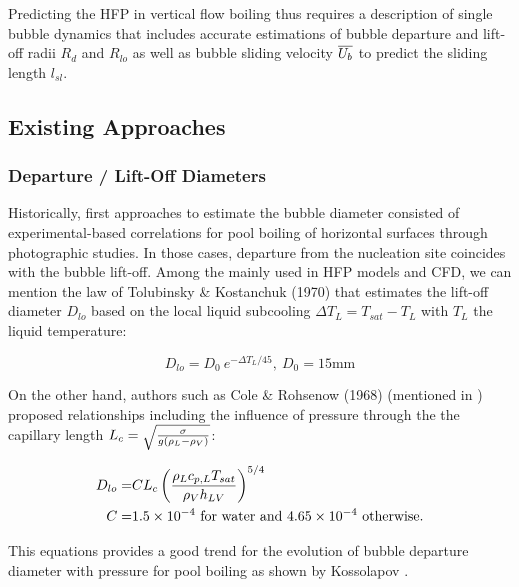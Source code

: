 \npar 

Predicting the HFP in vertical flow boiling thus requires a description of single bubble dynamics that includes accurate estimations of bubble departure and lift-off radii $R_{d}$ and $R_{lo}$ as well as bubble sliding velocity $\overline{U_{b}}$ to predict the sliding length $l_{sl}$.

\subsection{Existing Approaches}

\subsubsection{Departure / Lift-Off Diameters}

Historically, first approaches to estimate the bubble diameter consisted of experimental-based correlations for pool boiling of horizontal surfaces through photographic studies. In those cases, departure from the nucleation site coincides with the bubble lift-off. Among the mainly used in HFP models and CFD, we can mention the law of Tolubinsky \& Kostanchuk (1970)\cite{tolubinsky_vapour_1970} that estimates the lift-off diameter $D_{lo}$ based on the local liquid subcooling $\Delta T_{L} = T_{sat} - T_{L}$ with $T_{L}$ the liquid temperature:

\begin{equation}
D_{lo} = D_{0}~e^{-\Delta T_{L}/{45}},\ D_{0}=15\mathrm{mm}
\label{eq:dlo_tolubinsky}
\end{equation}

\npar
On the other hand, authors such as Cole \& Rohsenow (1968) (mentioned in \cite{kocamustafaogullari_pressure_1983}) proposed relationships including the influence of pressure through the the capillary length $L_{c}=\sqrt{\frac{\sigma}{g\left( \rho_{L}-\rho_{V} \right)}}$:

\begin{align}
D_{lo} =& C L_{c} \left( \frac{\rho_{L}c_{p,L}T_{sat}}{\rho_{V}h_{LV}} \right)^{5/4}
\label{eq:dlo_cole_rohsenow}
\\
\nonumber C=&1.5\times 10^{-4}\ \text{for water and }4.65\times 10^{-4}\ \text{otherwise}.
\end{align}

This equations provides a good trend for the evolution of bubble departure diameter with pressure for pool boiling as shown by Kossolapov \cite{kossolapov_experimental_2021}.


